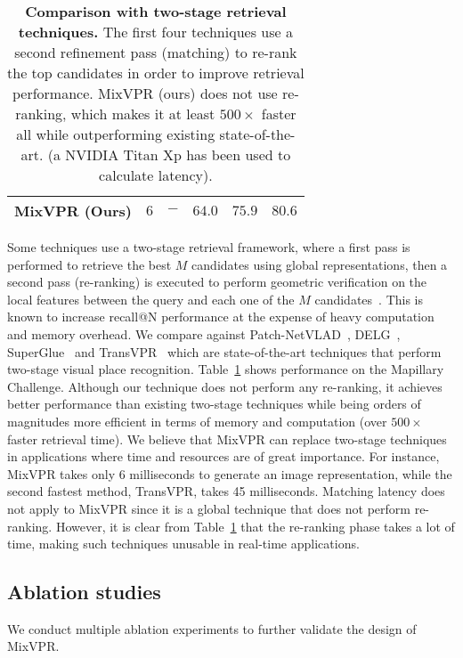 \documentclass[10pt,twocolumn,letterpaper]{article}
\begin{document}
\begin{table}[t]
{\begin{tabular}{|l|c|c|ccc|}
\textbf{MixVPR (Ours)}                & $6  $                                                                                 & $- $                                                                              & $\mathbf{64.0}$ & $\mathbf{75.9}$ & $\mathbf{80.6}$ \\ \hline
\end{tabular}}
\caption{\textbf{Comparison with two-stage retrieval techniques.} The first four techniques use a second refinement pass (matching) to re-rank the top candidates in order to improve retrieval performance. MixVPR (ours) does not use re-ranking, which makes it at least $500\times$ faster all while outperforming existing state-of-the-art. (a NVIDIA Titan Xp has been used to calculate latency).}
\label{tab:two-stage}
\end{table}
Some techniques use a two-stage retrieval framework, where a first pass is performed to retrieve the best $M$ candidates using global representations, then a second pass (re-ranking) is executed to perform geometric verification on the local features between the query and each one of the $M$ candidates~\cite{wang2022transvpr}. This is known to increase recall@N performance at the expense of heavy computation and memory overhead. We compare against Patch-NetVLAD~\cite{hausler2021patch}, DELG~\cite{cao2020unifying}, SuperGlue~\cite{sarlin2020superglue} and TransVPR~\cite{hausler2021patch} which are state-of-the-art techniques that perform two-stage visual place recognition. Table~\ref{tab:two-stage} shows performance on the Mapillary Challenge. Although our technique does not perform any re-ranking, it achieves better performance than existing two-stage techniques while being orders of magnitudes more efficient in terms of memory and computation (over $500\times$ faster retrieval time). We believe that MixVPR can replace two-stage techniques in applications where time and resources are of great importance. For instance, MixVPR takes only $6$ milliseconds to generate an image representation, while the second fastest method, TransVPR, takes 45 milliseconds. Matching latency does not apply to MixVPR since it is a global technique that does not perform re-ranking. However, it is clear from Table~\ref{tab:two-stage} that the re-ranking phase takes a lot of time, making such techniques unusable in real-time applications.


\subsection{Ablation studies}\label{sec:exp:ablation}
We conduct multiple ablation experiments to further validate the design of MixVPR.
\end{document}
